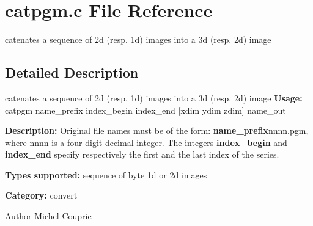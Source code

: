 \section{catpgm.c File Reference}
\label{catpgm_8c}


catenates a sequence of 2d (resp. 1d) images into a 3d (resp. 2d) image  




\subsection{Detailed Description}
catenates a sequence of 2d (resp. 1d) images into a 3d (resp. 2d) image {\bfseries Usage:} catpgm name\_\-prefix index\_\-begin index\_\-end [xdim ydim zdim] name\_\-out

{\bfseries Description:} Original file names must be of the form: {\bfseries name\_\-prefix}nnnn.pgm, where nnnn is a four digit decimal integer. The integers {\bfseries index\_\-begin} and {\bfseries index\_\-end} specify respectively the first and the last index of the series.

{\bfseries Types supported:} sequence of byte 1d or 2d images

{\bfseries Category:} convert

\begin{DoxyAuthor}{Author}
Michel Couprie 
\end{DoxyAuthor}
